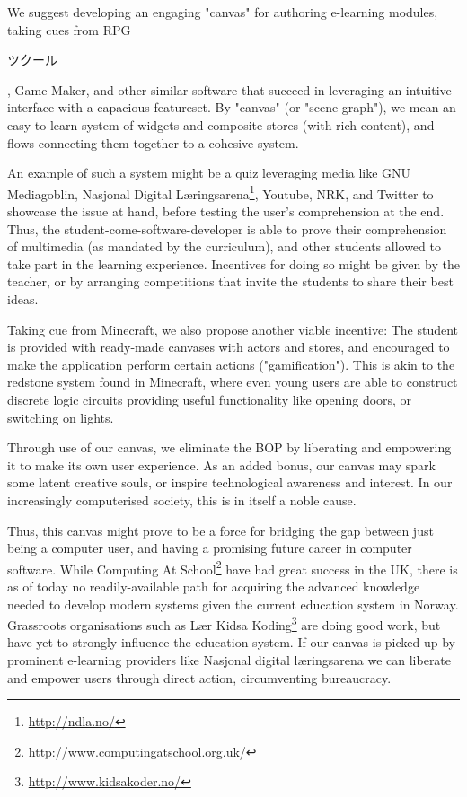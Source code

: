 We suggest developing an engaging "canvas"  for authoring e-learning modules, 
taking cues from RPG\begin{CJK}{UTF8}{min}ツクール\end{CJK}, Game Maker, and 
other similar software that succeed in leveraging an intuitive interface with 
a capacious featureset. By "canvas" (or "scene graph"), we mean an 
easy-to-learn system of widgets and composite stores (with rich content), and 
flows connecting them together to a cohesive system. 

An example of such a system might be a quiz leveraging media like GNU 
Mediagoblin, Nasjonal Digital Læringsarena\footnote{\url{http://ndla.no/}}, 
Youtube, NRK, and Twitter to showcase the issue at hand, before testing the 
user's comprehension at the end. Thus, the student-come-software-developer is 
able to prove their comprehension of multimedia (as mandated by the 
curriculum), and other students allowed to take part in the learning 
experience. Incentives for doing so might be given by the teacher, or by 
arranging competitions that invite the students to share their best ideas.

Taking cue from Minecraft, we also propose another viable incentive: The 
student is provided with ready-made canvases with actors and stores, and 
encouraged to make the application perform certain actions ("gamification"). 
This is akin to the redstone system found in Minecraft, where even young users 
are able to construct discrete logic circuits providing useful functionality 
like opening doors, or switching on lights\cite{brand2013crafting}.

Through use of our canvas, we eliminate the BOP by liberating and empowering 
it to make its own user experience. As an added bonus, our canvas may spark 
some latent creative souls, or inspire technological awareness and interest. 
In our increasingly computerised society, this is in itself a noble cause. 

Thus, this canvas might prove to be a force for bridging the gap between just 
being a computer user, and having a promising future career in computer 
software. While Computing At 
School\footnote{\url{http://www.computingatschool.org.uk/}} have had great 
success in the UK, there is as of today no readily-available path for 
acquiring the advanced knowledge needed to develop modern systems given the 
current education system in Norway. Grassroots organisations such as Lær Kidsa 
Koding\footnote{\url{http://www.kidsakoder.no/}} are doing good work, but have 
yet to strongly influence the education system. If our canvas is picked up by 
prominent e-learning providers like Nasjonal digital læringsarena we can 
liberate and empower users through direct action, circumventing bureaucracy.

